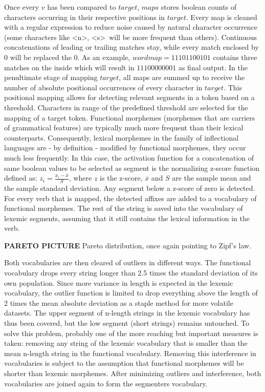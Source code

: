 Once every $v$ has been compared to $target$, $maps$ stores boolean counts of characters occurring in their respective positions in $target$.
Every map is cleaned with a regular expression to reduce noise caused by natural character occurrence (some characters like \textless n\textgreater, \textless s\textgreater ~will be more frequent than others).
Continuous concatenations of leading or trailing matches stay, while every match enclosed by $0$ will be replaced the $0$.
As an example, $wordmap = 11101100101$ contains three matches on the inside which will result in $11100000001$ as final output.
In the penultimate stage of mapping $target$, all maps are summed up to receive the number of absolute positional occurrences of every character in $target$.
This positional mapping allows for detecting relevant segments in a token based on a threshold.
Characters in range of the predefined threshold are selected for the mapping of a target token.
Functional morphemes (morphemes that are carriers of grammatical features) are typically much more frequent than their lexical counterparts.
Consequently, lexical morphemes in the family of inflectional languages are - by definition - modified by functional morphemes, they occur much less frequently.
In this case, the activation function for a concatenation of same boolean values to be selected as segment is the normalizing z-score function defined as: $z_{i} = \frac{x_{i} - \overline{x}}{S}$,
where $z$ is the z-score, $\overline{x}$ and $S$ are the sample mean and the sample standard deviation.
Any segment below a z-score of zero is detected.
For every verb that is mapped, the detected affixes are added to a vocabulary of functional morphemes.
The rest of the string is saved into the vocabulary of lexemic segments, assuming that it still contains the lexical information in the verb.

\textbf{PARETO PICTURE}
Pareto distribution, once again pointing to Zipf's law.

Both vocabularies are then cleared of outliers in different ways.
The functional vocabulary drops every string longer than 2.5 times the standard deviation of its own population.
Since more variance in length is expected in the lexemic vocabulary, the outlier function is limited to drop everything above the length  of 2 times the mean absolute deviation as a staple method for more volatile datasets.
The upper segment of n-length strings in the lexemic vocabulary has thus been covered, but the low segment (short strings) remains untouched.
To solve this problem, probably one of the more reaching but important measures is taken: removing any string of the lexemic vocabulary that is smaller than the mean n-length string in the functional vocabulary.
Removing this interference in vocabularies is subject to the assumption that functional morphemes will be shorter than lexemic morphemes.
After minimizing outliers and interference, both vocabularies are joined again to form the segmenters vocabulary.


